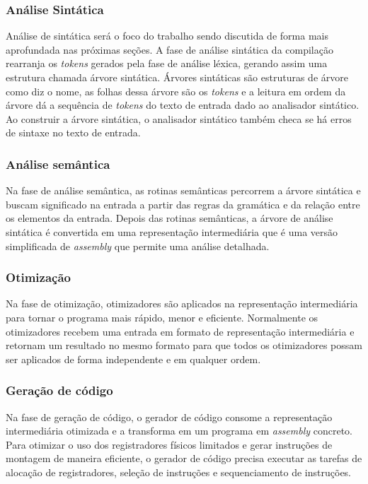 \subsubsection{Análise Sintática}
Análise de sintática será o foco do trabalho sendo discutida de forma mais aprofundada nas próximas seções. A fase de análise sintática da compilação rearranja os \textit{tokens} gerados pela fase de análise léxica, gerando assim uma estrutura chamada árvore sintática. Árvores sintáticas são estruturas de árvore como diz o nome, as folhas dessa árvore são os \textit{tokens} e a leitura em ordem da árvore dá a sequência de \textit{tokens} do texto de entrada dado ao analisador sintático. Ao construir a árvore sintática, o analisador sintático também checa se há erros de sintaxe no texto de entrada.

\subsubsection{Análise semântica}
Na fase de análise semântica, as rotinas semânticas percorrem a árvore sintática e buscam significado na entrada a partir das regras da gramática e da relação entre os elementos da entrada. Depois das rotinas semânticas, a árvore de análise sintática é convertida em uma representação intermediária que é uma versão simplificada de \textit{assembly} que permite uma análise detalhada.

\subsubsection{Otimização}
Na fase de otimização, otimizadores são aplicados na representação intermediária para tornar o programa mais rápido, menor e eficiente. Normalmente os otimizadores recebem uma entrada em formato de representação intermediária e retornam um resultado no mesmo formato para que todos os otimizadores possam ser aplicados de forma independente e em qualquer ordem.

\subsubsection{Geração de código}
Na fase de geração de código, o gerador de código consome a representação intermediária otimizada e a transforma em um programa em \textit{assembly} concreto. Para otimizar o uso dos registradores físicos limitados e gerar instruções de montagem de maneira eficiente, o gerador de código precisa executar as tarefas de alocação de registradores, seleção de instruções e sequenciamento de instruções.

